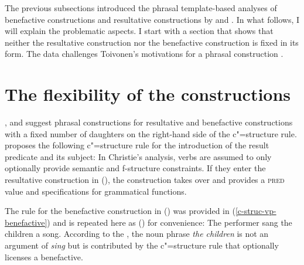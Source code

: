 The previous subsections introduced the phrasal template-based analyses of benefactive constructions
and resultative constructions by \citet{AGT2014a} and \citet{Christie2010a}. In what follows, I will
explain the problematic aspects. I start with a section that shows that neither the resultative
construction nor the benefactive construction is fixed in its form. The data challenges Toivonen's
motivations for a phrasal construction \citep{Toivonen2013a}.

\chapter{The flexibility of the constructions}
\label{sec-flexibility}

\citet{Christie2010a}, \citet{Toivonen2013a} and \citet{AGT2014a} suggest phrasal constructions
for resultative and benefactive constructions with a fixed number of daughters on the right-hand
side of the c"=structure rule. \citet{Christie2010a} proposes the following c"=structure rule for the introduction of the result
predicate and its subject:
\ea
\label{c-structure-resultative-christie}
\z
In Christie's analysis, verbs are assumed to only optionally provide semantic and f-structure
constraints. If they enter the resultative construction in (), the construction takes over
and provides a \textsc{pred} value and specifications for grammatical functions.

\largerpage
The rule for the benefactive construction in () was provided in
(\ref{c-struc-vp-benefactive}) and is repeated here as () for convenience:
\ea
The performer sang the children a song.
\z
\ea\label{c-struc-vp-benefactive-two}
\z
According to the \citet[]{AGT2014a}, the noun phrase \emph{the children} is not an argument
of \emph{sing} but is contributed by the c"=structure rule that optionally licenses a benefactive.

